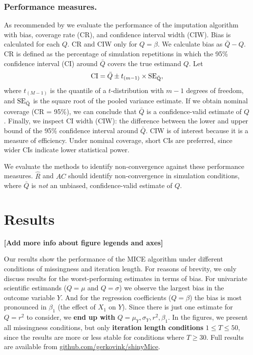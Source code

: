 \documentclass[Royal,times,sageh]{sagej}
\begin{document}
\hypertarget{performance-measures.}{%
\subsubsection{Performance measures.}\label{performance-measures.}}

As recommended by \citet{buur18} we evaluate the performance of the imputation algorithm with bias, coverage rate (CR), and confidence interval width (CIW). Bias is calculated for each \(Q\). CR and CIW only for \(Q = \beta\).
We calculate bias as \(\bar{Q} - Q\). CR is defined as the percentage of simulation repetitions in which the 95\% confidence interval (CI) around \(\bar{Q}\) covers the true estimand \(Q\). Let
\[\text{CI} = \bar{Q} \pm t_{(m-1)} \times \rm SE_{\bar{Q}},\]
where \(t_{(M-1)}\) is the quantile of a \(t\)-distribution with \(m-1\) degrees of freedom, and \(\rm SE_{\bar{Q}}\) is the square root of the pooled variance estimate. If we obtain nominal coverage (CR = 95\%), we can conclude that \(\bar{Q}\) is a confidence-valid estimate of \(Q\). Finally, we inspect CI width (CIW): the difference between the lower and upper bound of the 95\% confidence interval around \(\bar{Q}\). CIW is of interest because it is a measure of efficiency. Under nominal coverage, short CIs are preferred, since wider CIs indicate lower statistical power.

We evaluate the methods to identify non-convergence against these performance measures. \(\widehat{R}\) and \(AC\) should identify non-convergence in simulation conditions, where \(\bar{Q}\) is \emph{not} an unbiased, confidence-valid estimate of \(Q\).

\hypertarget{results}{%
\section{Results}\label{results}}

\textbf{{[}Add more info about figure legends and axes{]}}

Our results show the performance of the MICE algorithm under different conditions of missingness and iteration length. For reasons of brevity, we only discuss results for the worst-performing estimates in terms of bias. For univariate scientific estimands (\(Q=\mu\) and \(Q=\sigma\)) we observe the largest bias in the outcome variable \(Y\). And for the regression coefficients (\(Q=\beta\)) the bias is most pronounced in \(\beta_1\) (the effect of \(X_1\) on \(Y\)). Since there is just one estimate for \(Q=r^2\) to consider, we \textbf{end up with} \(Q=\mu_Y, \sigma_Y,r^2, \beta_1\). In the figures, we present all missingness conditions, but only \textbf{iteration length conditions} \(1 \leq T\leq50\), since the results are more or less stable for conditions where \(T \geq 30\). Full results are available from \href{https://github.com/gerkovink/shinyMice/tree/master/3.Thesis/1.SimulationStudy}{github.com/gerkovink/shinyMice}.
\end{document}
